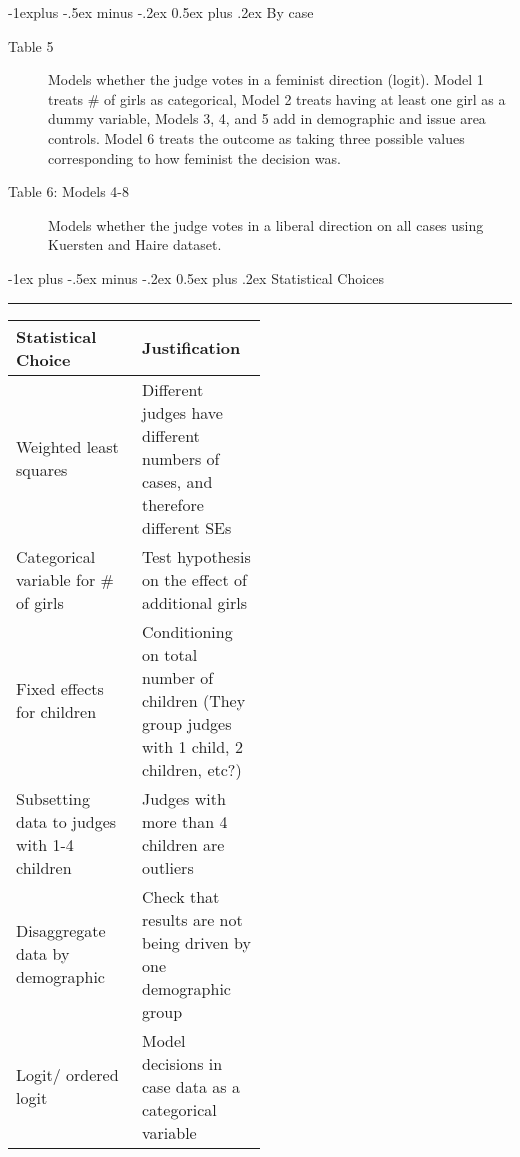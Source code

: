 \documentclass[10pt,landscape]{article}
\makeatletter
\renewcommand{\section}{\@startsection{section}{1}{0mm}%
                                {-1ex plus -.5ex minus -.2ex}%
                                {0.5ex plus .2ex}%
                                {\normalfont\Large\bfseries}}
\renewcommand{\subsection}{\@startsection{subsection}{2}{0mm}%
                                {-1explus -.5ex minus -.2ex}%
                                {0.5ex plus .2ex}%
                                {\normalfont\Large\bfseries}}
\makeatother
\begin{document}
\begin{multicols*}{2}
   \subsection{By case}
   \begin{description}
        \item[Table 5] Models whether the judge votes in a feminist direction (logit). Model 1 treats \# of girls as categorical, Model 2 treats having at least one girl as a dummy variable, Models 3, 4, and 5 add in demographic and issue area controls. Model 6 treats the outcome as taking three possible values corresponding to how feminist the decision was.
        \item[Table 6: Models 4-8] Models whether the judge votes in a liberal direction on all cases using Kuersten and Haire dataset.
   
   \end{description}
   
\section{Statistical Choices}\smallskip \hrule height 2pt \smallskip

   \begin{center}
   
   \begin{tabular}{|l|p{0.5\linewidth}|} \hline
   \textbf{Statistical Choice} & \textbf{Justification} \\\hline
   Weighted least squares & Different judges have different numbers of cases, and therefore different SEs \\\hline
   Categorical variable for \# of girls & Test hypothesis on the effect of additional girls \\\hline
   Fixed effects for children & Conditioning on total number of children (They group judges with 1 child, 2 children, etc?) \\\hline
   Subsetting data to judges with 1-4 children & Judges with more than 4 children are outliers \\\hline
   Disaggregate data by demographic & Check that results are not being driven by one demographic group \\\hline
   Logit/ ordered logit & Model decisions in case data as a categorical variable \\\hline
   
   \end{tabular}
   \end{center}

\end{multicols*}
\end{document}
